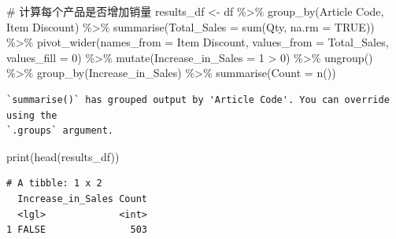 \documentclass[
  letterpaper,
  DIV=11,
  numbers=noendperiod]{scrartcl}
\newenvironment{Shaded}{\begin{snugshade}}{\end{snugshade}}
\newcommand{\AttributeTok}[1]{\textcolor[rgb]{0.40,0.45,0.13}{#1}}
\newcommand{\CommentTok}[1]{\textcolor[rgb]{0.37,0.37,0.37}{#1}}
\newcommand{\ConstantTok}[1]{\textcolor[rgb]{0.56,0.35,0.01}{#1}}
\newcommand{\DecValTok}[1]{\textcolor[rgb]{0.68,0.00,0.00}{#1}}
\newcommand{\FunctionTok}[1]{\textcolor[rgb]{0.28,0.35,0.67}{#1}}
\newcommand{\NormalTok}[1]{\textcolor[rgb]{0.00,0.23,0.31}{#1}}
\newcommand{\OtherTok}[1]{\textcolor[rgb]{0.00,0.23,0.31}{#1}}
\newcommand{\SpecialCharTok}[1]{\textcolor[rgb]{0.37,0.37,0.37}{#1}}
\newcommand{\StringTok}[1]{\textcolor[rgb]{0.13,0.47,0.30}{#1}}
\begin{document}
\begin{Shaded}
\begin{Highlighting}[]
\CommentTok{\# 计算每个产品是否增加销量}
\NormalTok{results\_df }\OtherTok{\textless{}{-}}\NormalTok{ df }\SpecialCharTok{\%\textgreater{}\%}
  \FunctionTok{group\_by}\NormalTok{(}\StringTok{\textasciigrave{}}\AttributeTok{Article Code}\StringTok{\textasciigrave{}}\NormalTok{, }\StringTok{\textasciigrave{}}\AttributeTok{Item Discount}\StringTok{\textasciigrave{}}\NormalTok{) }\SpecialCharTok{\%\textgreater{}\%}
  \FunctionTok{summarise}\NormalTok{(}\AttributeTok{Total\_Sales =} \FunctionTok{sum}\NormalTok{(Qty, }\AttributeTok{na.rm =} \ConstantTok{TRUE}\NormalTok{)) }\SpecialCharTok{\%\textgreater{}\%}
  \FunctionTok{pivot\_wider}\NormalTok{(}\AttributeTok{names\_from =} \StringTok{\textasciigrave{}}\AttributeTok{Item Discount}\StringTok{\textasciigrave{}}\NormalTok{, }\AttributeTok{values\_from =}\NormalTok{ Total\_Sales, }\AttributeTok{values\_fill =} \DecValTok{0}\NormalTok{) }\SpecialCharTok{\%\textgreater{}\%}
  \FunctionTok{mutate}\NormalTok{(}\AttributeTok{Increase\_in\_Sales =} \StringTok{\textasciigrave{}}\AttributeTok{1}\StringTok{\textasciigrave{}} \SpecialCharTok{\textgreater{}} \StringTok{\textasciigrave{}}\AttributeTok{0}\StringTok{\textasciigrave{}}\NormalTok{) }\SpecialCharTok{\%\textgreater{}\%}
  \FunctionTok{ungroup}\NormalTok{() }\SpecialCharTok{\%\textgreater{}\%}
  \FunctionTok{group\_by}\NormalTok{(Increase\_in\_Sales) }\SpecialCharTok{\%\textgreater{}\%}
  \FunctionTok{summarise}\NormalTok{(}\AttributeTok{Count =} \FunctionTok{n}\NormalTok{())}
\end{Highlighting}
\end{Shaded}

\begin{verbatim}
`summarise()` has grouped output by 'Article Code'. You can override using the
`.groups` argument.
\end{verbatim}

\begin{Shaded}
\begin{Highlighting}[]
\FunctionTok{print}\NormalTok{(}\FunctionTok{head}\NormalTok{(results\_df))}
\end{Highlighting}
\end{Shaded}

\begin{verbatim}
# A tibble: 1 x 2
  Increase_in_Sales Count
  <lgl>             <int>
1 FALSE               503
\end{verbatim}
\end{document}
